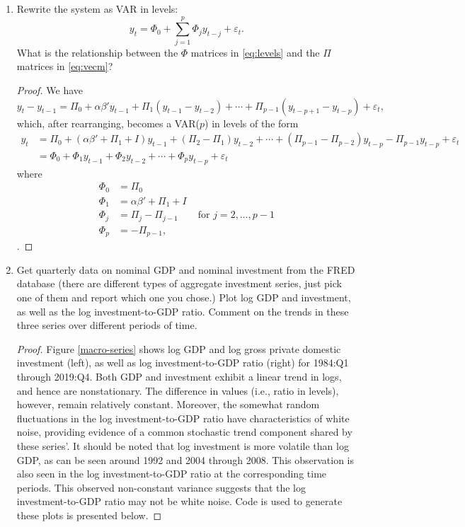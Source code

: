 \documentclass[oneside,reqno]{amsart}
\newcommand{\eps}{\varepsilon}
\theoremstyle{definition}
\begin{document}
\begin{enumerate}[label=(\roman*)]
\item
Rewrite the system as VAR in levels:
\begin{equation}\label{eq:levels}
	y_t = \Phi_0 + \sum_{j=1}^p \Phi_j y_{t-j} + \eps_t.
\end{equation}
What is the relationship between the $\Phi$ matrices in \eqref{eq:levels} and the $\Pi$ matrices in \eqref{eq:vecm}?
\begin{proof}
We have
\[
	y_t - y_{t-1} = \Pi_0 + \alpha \beta' y_{t-1} + \Pi_1 (y_{t-1}  - y_{t-2}) +  \cdots  + \Pi_{p-1} (y_{t-p+1}  - y_{t-p}) + \eps_t,
\]
which, after rearranging, becomes a VAR($p$) in levels of the form
\begin{align*}
	y_t  &= \Pi_0 +  (\alpha \beta' + \Pi_1 + I)y_{t-1}  +(\Pi_2 - \Pi_1) y_{t-2} + \cdots + (\Pi_{p-1} - \Pi_{p-2})  y_{t-p} - \Pi_{p-1}y_{t-p} + \eps_t \\
	&= \Phi_0 +  \Phi_1 y_{t-1}  + \Phi_2 y_{t-2} + \cdots + \Phi_p y_{t-p} + \eps_t
\end{align*}
where 
\begin{align*}
	\Phi_0 &= \Pi_0 \\
	\Phi_1 &=  \alpha \beta' + \Pi_1 + I \\
	\Phi_j &= \Pi_j - \Pi_{j-1} \qquad \text{for } j = 2,\dotsc, p-1 \\
	\Phi_p &= - \Pi_{p-1},
\end{align*} 
.
\end{proof}
\item
Get quarterly data on nominal GDP and nominal investment from the
FRED database (there are different types of aggregate investment series,
just pick one of them and report which one you chose.) Plot log GDP
and investment, as well as the log investment-to-GDP ratio. Comment
on the trends in these three series over different periods of time.
\begin{proof}
Figure \eqref{macro-series} shows log GDP and log gross private domestic investment (left), as well as  log investment-to-GDP ratio (right) for 1984:Q1 through 2019:Q4. Both GDP and investment exhibit a linear trend in logs, and hence are nonstationary. The difference in values (i.e., ratio in levels), however, remain relatively constant. Moreover, the somewhat random fluctuations in the log investment-to-GDP ratio have characteristics of white noise, providing evidence of a common stochastic trend component shared by these series'. It should be noted that log investment is more volatile than log GDP, as can be seen around 1992 and 2004 through 2008. This observation is also seen in the log investment-to-GDP ratio at the corresponding time periods. This observed non-constant variance suggests that the log investment-to-GDP ratio may not be white noise. Code is used to generate these plots is presented below.


\end{proof}
\end{enumerate}
\end{document}
